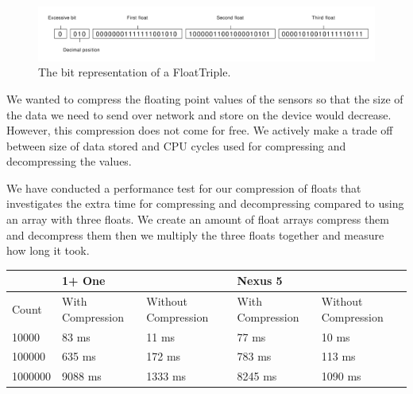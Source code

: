 \begin{figure}[!htbp]
    \centering
    \includegraphics[width=\textwidth]{graphic/gathering_sensor_data/float_triple_bit.pdf}
    \caption{The bit representation of a FloatTriple.}
    \label{fig:float_triple_bit}
\end{figure}
We wanted to compress the floating point values of the sensors so that the size of the data we need to send over network and store on the device would decrease. However, this compression does not come for free. We actively make a trade off between size of data stored and CPU cycles used for compressing and decompressing the values.  

We have conducted a performance test for our compression of floats that investigates the extra time for compressing and decompressing compared to using an array with three floats. We create an amount of float arrays compress them and decompress them then we multiply the three floats together and measure how long it took.

\begin{table}[!htbp]
    \centering
    \begin{tabular}{ | m{} | m{} | m{} | m{} | m{} | }
    \hline
    ~       & 1+ One           & ~                   & Nexus 5          & ~                   \\ \hline
    Count   & With Compression & Without Compression & With Compression & Without Compression \\ \hline
    10000   & 83 ms            & 11 ms               & 77 ms            & 10 ms               \\ \hline
    100000  & 635 ms           & 172 ms              & 783 ms           &  113 ms             \\ \hline
    1000000 & 9088 ms          & 1333 ms             & 8245 ms          & 1090 ms             \\ \hline
    \end{tabular}
\end{table}
\FloatBarrier


